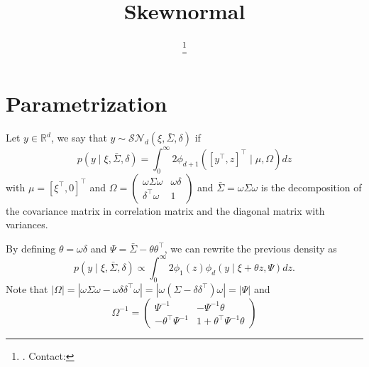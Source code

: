 \documentclass[fleqn]{article}
\title{Skewnormal}
\author{\myName\thanks{\myDept. Contact: \myMail}}
\theoremstyle{theorem}
\theoremstyle{definition}
\newcommand{\abs}[1]{\left\vert#1\right\vert}
\newcommand{\SN}[2][]{\mathcal{SN}_{#1}\left(#2\right)}
\begin{document}
    \maketitle

    \section{Parametrization}
    Let $y\in\mathbb{R}^d$, we say that $y\sim\SN[d]{\xi, \bar\Sigma, \delta}$ if
    \begin{equation}\label{eq:first}
        p(y\mid \xi, \bar\Sigma, \delta) = \int_0^\infty 2\phi_{d+1}\left(\left[y^\top, z\right]^\top\mid \mu, \Omega\right)dz
    \end{equation}
    with $\mu=\left[\xi^\top, 0\right]^\top$ and $\Omega=\begin{pmatrix}
        \omega\Sigma\omega  &   \omega\delta\\
        \delta^\top\omega   &   1
    \end{pmatrix}$ and $\bar\Sigma = \omega\Sigma\omega$ is the decomposition of the covariance matrix in correlation matrix and the diagonal matrix with variances.

    By defining $\theta= \omega\delta$ and $\Psi = \bar\Sigma - \theta\theta^\top$, we can rewrite the previous density as
    \begin{equation}\label{eq:second}
        p(y\mid \xi, \bar\Sigma, \delta) \propto \int_0^\infty 2\phi_1(z)\phi_d\!\left(y\mid \xi+\theta z, \Psi\right)dz.
    \end{equation}
    Note that $\abs{\Omega} = \abs{\omega\Sigma\omega - \omega\delta\delta^\top\omega} = \abs{\omega\left(\Sigma-\delta\delta^\top\right)\omega} = \abs{\Psi}$ and
    \begin{equation*}
        \Omega^{-1} = \begin{pmatrix}
            \Psi^{-1}   &   -\Psi^{-1}\theta\\
            - \theta^\top\Psi^{-1}  &   1 + \theta^\top\Psi^{-1}\theta
        \end{pmatrix}
    \end{equation*}
\end{document}
